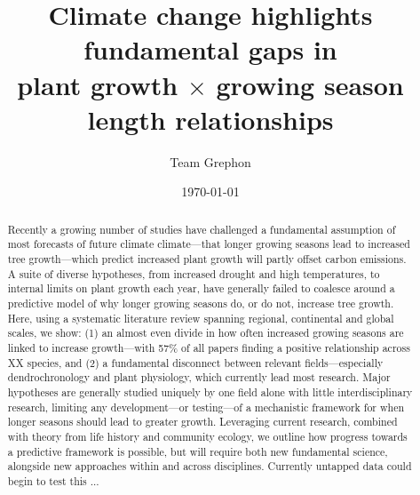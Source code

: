 \documentclass[11pt]{article}
\begin{document}
\renewcommand{\refname}{\CHead{}}


\title{Climate change highlights fundamental gaps in\\ plant growth $\times$ growing season length relationships} %
\author{Team Grephon}
\date{\today}
\maketitle



\begin{abstract}
Recently a growing number of studies have challenged a fundamental assumption of most forecasts of future climate climate---that longer growing seasons lead to increased tree growth---which predict increased plant growth will partly offset carbon emissions. A suite of diverse hypotheses, from increased drought and high temperatures, to internal limits on plant growth each year, have generally failed to coalesce around a predictive model of why longer growing seasons do, or do not, increase tree growth. Here, using a systematic literature review spanning regional, continental and global scales, we show: (1) an almost even divide in how often increased growing seasons are linked to increase growth---with 57\% of all papers finding a positive relationship across XX species, and (2) a fundamental disconnect between relevant fields---especially dendrochronology and plant physiology, which currently lead most research. Major hypotheses are generally studied uniquely by one field alone with little interdisciplinary research, limiting any development---or testing---of a mechanistic framework for when longer seasons should lead to greater growth. Leveraging current research, combined with theory from life history and community ecology, we outline how progress towards a predictive framework is possible, but will require both new fundamental science, alongside new approaches within and across disciplines. Currently untapped data could begin to test this ... 
\end{abstract}
\end{document}
